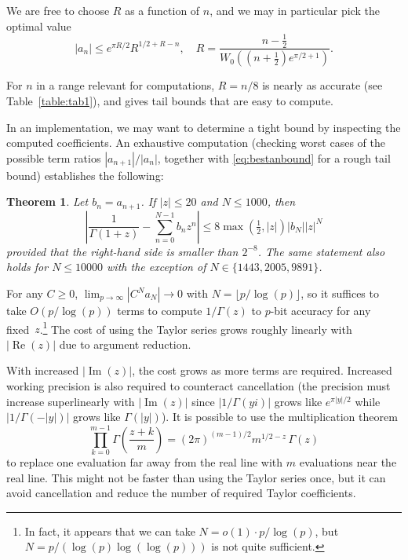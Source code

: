 \documentclass[reqno]{amsart}
\newcommand{\Real}{\operatorname{Re}}
\newcommand{\Imag}{\operatorname{Im}}
\newtheorem{theorem}{Theorem}[section]
\theoremstyle{definition}
\begin{document}
We are free to choose $R$ as a function of $n$,
and we may in particular pick the optimal value
\begin{equation}
|a_n| \le e^{\pi R/2} R^{1/2+R-n}, \quad R = \frac{n-\tfrac{1}{2}}{W_0((n+\tfrac{1}{2}) e^{\pi/2+1})}.
\label{eq:bestanbound}
\end{equation}

For $n$ in a range relevant for computations,
$R = n/8$ is nearly as accurate (see Table~\ref{table:tab1}),
and gives tail bounds that are easy to compute.

In an implementation, we may want to determine
a tight bound by inspecting the computed coefficients.
An exhaustive computation
(checking worst cases of the possible term ratios $|a_{n+1}| / |a_n|$,
together with \eqref{eq:bestanbound} for a rough tail bound)
establishes the following:

\begin{theorem}
Let $b_n = a_{n+1}$. If $|z| \le 20$ and $N \le 1000$, then
\begin{equation}
\left| \frac{1}{\Gamma(1+z)} - \sum_{n=0}^{N-1} b_n z^n \right| \le 8 \max(\tfrac{1}{2}, |z|) |b_N| |z|^N
\end{equation}
provided that the right-hand side is smaller than $2^{-8}$.
The same statement also holds for $N \le 10000$ with the exception of $N \in \{1443, 2005, 9891\}$.
\end{theorem}

For any $C \ge 0$, $\lim_{p \to \infty} |C^N a_N| \to 0$ with $N = \lfloor p / \log(p) \rfloor$,
so it suffices to take $O(p / \log(p))$ terms
to compute $1/\Gamma(z)$ to $p$-bit accuracy for any fixed~$z$.\footnote{In fact, it appears that we can take
$N = o(1) \cdot p / \log(p)$, but $N = p / (\log(p) \log(\log(p)))$ is not quite sufficient.}
The cost of using the Taylor series grows roughly linearly with $|\Real(z)|$ due
to argument reduction.

With increased $|\Imag(z)|$, the cost grows as more terms are required.
Increased working precision is also required to counteract
cancellation (the precision must increase superlinearly with $|\Imag(z)|$
since $|1 / \Gamma(yi)|$ grows like $e^{\pi |y|/2}$
while $|1 / \Gamma(-|y|)|$ grows like $\Gamma(|y|)$).
It is possible to use the multiplication theorem
\begin{equation}
\prod_{k=0}^{m - 1} \Gamma\!\left(\frac{z + k}{m}\right) = {\left(2 \pi\right)}^{\left( m - 1 \right) / 2} {m}^{1 / 2 - z} \, \Gamma\!\left(z\right)
\end{equation}
to replace one evaluation far away from the real
line with $m$ evaluations near the real line.
This might not be faster than using the Taylor series once,
but it can avoid cancellation and reduce the
number of required Taylor coefficients.
\end{document}
